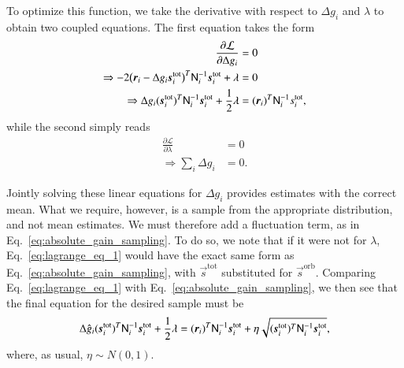 \documentclass[twocolumn]{aa}
\newcommand{\s}[0]{\vec{s}}
\newcommand{\N}[0]{\tens{N}}
\renewcommand{\r}[0]{\vec{r}}
\newcommand{\tot}[0]{^{\mathrm{tot}}}
\newcommand{\orb}[0]{^{\mathrm{orb}}}
\begin{document}
To optimize this function, we take the derivative with respect to
$\Delta g_i$ and $\lambda$ to obtain two coupled equations. The first
equation takes the form
\begin{align}
    \frac{\partial \mathcal{L}}{\partial \Delta g_i}  &= 0 \nonumber \\
    \Rightarrow -2\bigl( \r_i - \Delta g_i\s_i^{\mathrm{tot}}\bigr)^T\N^{-1}_i\s_i^{\mathrm{tot}} + \lambda &= 0 \nonumber \\
    \Rightarrow \Delta g_i (\s_i^{\mathrm{tot}})^T\N^{-1}_i\s_i^{\mathrm{tot}} + \frac{1}{2}\lambda &= (\r_i)^T \N^{-1}_i s_i^{\mathrm{tot}},
    \label{eq:lagrange_eq_1}
\end{align}
while the second simply reads
\begin{align}
    \frac{\partial \mathcal{L}}{\partial \lambda} & = 0 \nonumber \\
    \Rightarrow \sum_i \Delta g_i & = 0.
\end{align}

Jointly solving these linear equations for $\Delta g_i$ provides
estimates with the correct mean. What we require, however, is a sample
from the appropriate distribution, and not mean estimates. We must
therefore add a fluctuation term, as in
Eq.~\eqref{eq:absolute_gain_sampling}. To do so, we note that if it
were not for $\lambda$, Eq.~\eqref{eq:lagrange_eq_1} would have the
exact same form as Eq.~\eqref{eq:absolute_gain_sampling}, with $\s\tot$ substituted for $\s\orb$. Comparing
Eq.~\eqref{eq:lagrange_eq_1} with Eq.~\eqref{eq:absolute_gain_sampling},
we then see that the final equation for the desired sample must be
\begin{equation}
	\Delta\hat{g}_i (\s_i\tot)^T\N^{-1}_i\s_i\tot + \frac{1}{2}\lambda = (\r_i)^T\N_i^{-1}\s_i\tot + \eta\sqrt{(\s\tot_i)^T\N_i^{-1}\s\tot_i},
\end{equation}
where, as usual, $\eta\sim N(0,1)$.
\end{document}
